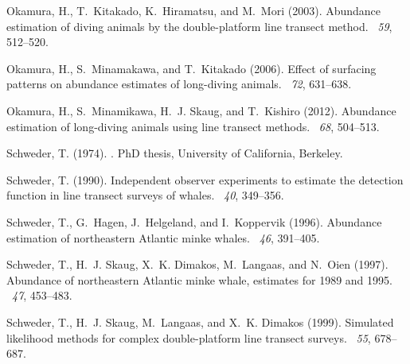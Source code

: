 \documentclass[useAMS,usenatbib,referee]{biom}
\begin{document}
\begin{thebibliography}{}
Okamura, H., T.~Kitakado, K.~Hiramatsu, and M.~Mori (2003).
\newblock Abundance estimation of diving animals by the double-platform line
  transect method.
~{\em 59}, 512--520.

Okamura, H., S.~Minamakawa, and T.~Kitakado (2006).
\newblock Effect of surfacing patterns on abundance estimates of long-diving
  animals.
~{\em 72}, 631--638.

Okamura, H., S.~Minamikawa, H.~J. Skaug, and T.~Kishiro (2012).
\newblock Abundance estimation of long-diving animals using line transect
  methods.
~{\em 68}, 504--513.

Schweder, T. (1974).
.
\newblock Ph{D} thesis, University of California, Berkeley.

Schweder, T. (1990).
\newblock Independent observer experiments to estimate the detection function
  in line transect surveys of whales.
~{\em 40},
  349--356.

Schweder, T., G.~Hagen, J.~Helgeland, and I.~Koppervik (1996).
\newblock Abundance estimation of northeastern {A}tlantic minke whales.
~{\em 46},
  391--405.

Schweder, T., H.~J. Skaug, X.~K. Dimakos, M.~Langaas, and N.~Oien (1997).
\newblock Abundance of northeastern {A}tlantic minke whale, estimates for 1989
  and 1995.
~{\em 47},
  453--483.

Schweder, T., H.~J. Skaug, M.~Langaas, and X.~K. Dimakos (1999).
\newblock Simulated likelihood methods for complex double-platform line
  transect surveys.
~{\em 55}, 678--687.


\end{thebibliography}
\end{document}
